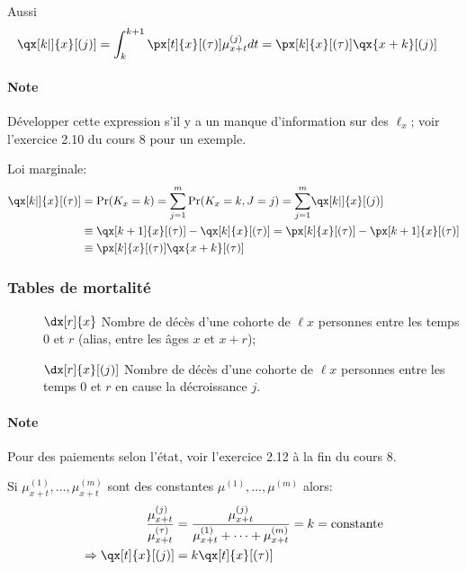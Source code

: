 \documentclass[10pt, french]{article}
\begin{document}
\begin{multicols*}{2}
Aussi
\begin{align*}
	\qx[k|]{x}[(j)]
	&=	\int_{k}^{k + 1} \px[t]{x}[(\tau)] \mu_{x + t}^{(j)}dt
	=	\px[k]{x}[(\tau)] \qx{x + k}[(j)]
\end{align*}
\paragraph{Note}	Développer cette expression s'il y a un manque d'information sur des $\ell_{x}$; voir l'exercice 2.10 du cours 8 pour un exemple.

Loi marginale:
\begin{align*}
	\qx[k|]{x}[(\tau)]
	&=	\Pr(K_{x} = k)
	=	\sumz{m}{j = 1} \Pr(K_{x} = k, J = j)
	=	\sumz{m}{j = 1} \qx[k|]{x}[(j)]	\\
	&\equiv	\qx[k + 1]{x}[(\tau)] - \qx[k]{x}[(\tau)]
	=	\px[k]{x}[(\tau)] - \px[k + 1]{x}[(\tau)]	\\
	&\equiv \px[k]{x}[(\tau)] \qx{x + k}[(\tau)]
\end{align*}

\subsubsection*{Tables de mortalité}
\begin{description}
	\item[]	$\dx[r]{x}$	Nombre de décès d'une cohorte de $\ell{x}$ personnes entre les temps 0 et $r$ (alias, entre les âges $x$ et $x + r$);
	\item[]	$\dx[r]{x}[(j)]$	Nombre de décès d'une cohorte de $\ell{x}$ personnes entre les temps 0 et $r$ en cause la décroissance $j$.
\end{description}

\paragraph{Note}	Pour des paiements selon l'état, voir l'exercice 2.12 à la fin du cours 8. 

Si $\mu_{x + t}^{(1)}, \dots, \mu_{x + t}^{(m)}$ sont des constantes $\mu^{(1)}, \dots, \mu^{(m)}$ alors:
\begin{align*}
	\frac{\mu_{x + t}^{(j)}}{\mu_{x + t}^{(\tau)}}
	&=	\frac{\mu_{x + t}^{(j)}}{\mu_{x + t}^{(1)} + \dots + \mu_{x + t}^{(m)}}	
	=	k	
	=	\text{constante}	\\
	\Rightarrow	\qx[t]{x}[(j)]
	&=	k \qx[t]{x}[(\tau)]
\end{align*}

\columnbreak


\end{multicols*}
\end{document}
